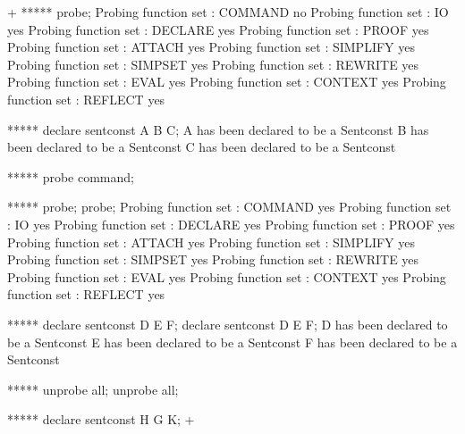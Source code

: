 



\gfexample+
   ***** probe;
   Probing function set : COMMAND no
   Probing function set : IO yes
   Probing function set : DECLARE yes
   Probing function set : PROOF yes
   Probing function set : ATTACH yes
   Probing function set : SIMPLIFY yes
   Probing function set : SIMPSET yes
   Probing function set : REWRITE yes
   Probing function set : EVAL yes
   Probing function set : CONTEXT yes
   Probing function set : REFLECT yes
   
   ***** declare sentconst A B C;
   A has been declared to be a Sentconst
   B has been declared to be a Sentconst
   C has been declared to be a Sentconst
   
   ***** probe command;
   
   ***** probe;
   probe;
   Probing function set : COMMAND yes
   Probing function set : IO yes
   Probing function set : DECLARE yes
   Probing function set : PROOF yes
   Probing function set : ATTACH yes
   Probing function set : SIMPLIFY yes
   Probing function set : SIMPSET yes
   Probing function set : REWRITE yes
   Probing function set : EVAL yes
   Probing function set : CONTEXT yes
   Probing function set : REFLECT yes
   
   ***** declare sentconst D E F;
   declare sentconst D E F;
   D has been declared to be a Sentconst
   E has been declared to be a Sentconst
   F has been declared to be a Sentconst
   
   ***** unprobe all;
   unprobe all;
   
   ***** declare sentconst H G K;
+

\gfnotes{}
